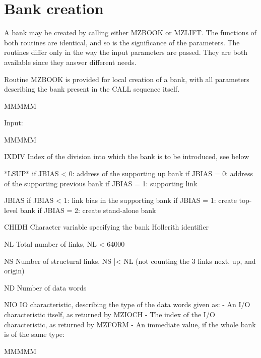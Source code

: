 \section{Bank creation}
\par A bank may be created by calling either MZBOOK or MZLIFT.
The functions of both routines are identical, and so is the
significance of the parameters. The routines differ only in the way the
input parameters are passed. They are both available since they
answer different needs.
\par Routine
MZBOOK is provided for local creation of a bank, with all parameters
describing the bank present in the CALL sequence itself.
\begin{DL}{MMMMM}
\item[Input:
]
\begin{DL}{MMMMM}
\item[IXDIV
]Index of the division into which the bank is
to be introduced, see below
\item[*LSUP*
]if JBIAS < 0:  address of the supporting up bank
\newline if JBIAS = 0:  address of the supporting previous bank
\newline if JBIAS = 1:  supporting link
\item[JBIAS
]if JBIAS < 1:  link bias in the supporting bank
\newline if JBIAS = 1:  create top-level bank
\newline if JBIAS = 2:  create stand-alone bank
\item[CHIDH
]Character variable specifying the bank Hollerith identifier
\item[NL
]Total number of links, NL < 64000
\item[NS
]Number of structural links, NS |< NL
\newline (not counting the 3 links next, up, and origin)
\item[ND
]Number of data words
\item[NIO
]IO characteristic, describing the type of the data words given as:
\newline - An I/O characteristic itself, as returned by MZIOCH
\newline - The index of the I/O characteristic, as returned by MZFORM
\newline - An immediate value, if the whole bank is of the same type:
\begin{DL}{MMMMM}

\end{DL}
\end{DL}
\end{DL}
